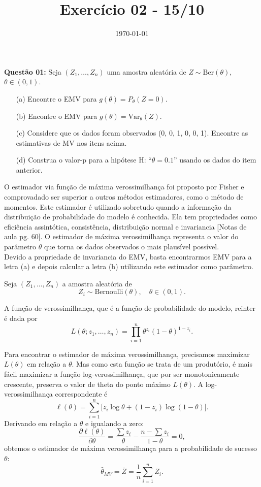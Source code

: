 \documentclass[a4paper]{article}
\date{\today}
\title{Exercício 02 - 15/10}
\begin{document}
    \header{}

\textbf{Questão 01:}  
Seja $(Z_1, \ldots, Z_n)$ uma amostra aleatória de $Z \sim \text{Ber}(\theta)$, $\theta \in (0,1)$.
\begin{itemize}
  \item[(a)] Encontre o EMV para $g(\theta) = P_\theta(Z = 0)$.
  \item[(b)] Encontre o EMV para $g(\theta) = \mathrm{Var}_\theta(Z)$.
  \item[(c)] Considere que os dados foram observados (0, 0, 1, 0, 0, 1). Encontre as estimativas de MV nos itens acima.
  \item[(d)] Construa o valor-p para a hipótese H: ``$\theta = 0.1$'' usando os dados do item anterior.
\end{itemize}

    \begin{answer}[]
O estimador via função de máxima verossimilhança foi proposto por Fisher e comprovadado ser superior a outros métodos estimadores, como o método de momentos. 
Este estimador é utilizado sobretudo quando a informação da distribuição de probabilidade do modelo é conhecida. 
Ela tem propriedades como eficiência assintótica, consistência, distribuição normal e invariancia [Notas de aula pg. 60]. 
O estimador de máxima verossimilhança representa o valor do parâmetro $\theta$ que torna os dados observados o mais plausível possível. 
\\[0.5em]
Devido a propriedade de invariancia do EMV, basta encontrarmos EMV para a letra (a) e depois calcular a letra (b) utilizando este estimador como parâmetro.


Seja \( (Z_1, \dots, Z_n) \) a amostra aleatória de 
\[
Z_i \sim \mathrm{Bernoulli}(\theta), \quad \theta \in (0,1).
\]

A função de verossimilhança, que é a função de probabilidade do modelo, reinter é dada por
\[
L(\theta; z_1, \dots, z_n)
= \prod_{i=1}^n \theta^{z_i}(1-\theta)^{1-z_i}.
\]

Para encontrar o estimador de máxima verossimilhança, precisamos maximizar \( L(\theta) \) em relação a \( \theta \). Mas como esta função se trata de um produtório,
é mais fácil maximizar a função log-verossimilhança, que por ser monotonicamente crescente, preserva o valor de theta do ponto máximo \( L(\theta) \).
A log-verossimilhança correspondente é
\[
\ell(\theta) 
= \sum_{i=1}^n \big[z_i \log\theta + (1-z_i)\log(1-\theta)\big].
\]
Derivando em relação a \(\theta\) e igualando a zero:
\[
\frac{\partial \ell(\theta)}{\partial \theta}
= \frac{\sum z_i}{\theta} - \frac{n-\sum z_i}{1-\theta} = 0,
\]
obtemos o estimador de máxima verossimilhança para a probabilidade de sucesso \(\theta\):
\[
\boxed{\hat{\theta}_{MV} = \bar{Z} = \frac{1}{n}\sum_{i=1}^n Z_i.}
\]


\end{answer}
\end{document}
